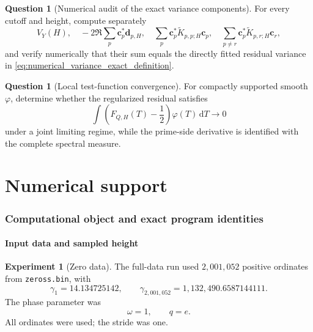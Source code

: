 \documentclass[11pt]{amsart}
\numberwithin{equation}{section}
\theoremstyle{plain}
\theoremstyle{definition}
\newtheorem{experiment}[theorem]{Experiment}
\newtheorem{question}[theorem]{Question}
\theoremstyle{remark}
\newcommand{\1}{\mathbf{1}}
\newcommand{\dd}{\,\mathrm{d}}
\begin{document}
\begin{question}[Numerical audit of the exact variance components]
\label{question:projected_tower_blocks}
For every cutoff and height, compute separately
\begin{equation}
V_Y(H),
\quad
-2\Re\sum_p\mathbf c_p^\ast\mathbf d_{p,H},
\quad
\sum_p\mathbf c_p^\ast\widetilde K_{p,p;H}\mathbf c_p,
\quad
\sum_{p\neq r}\mathbf c_p^\ast\widetilde K_{p,r;H}\mathbf c_r,
\label{eq:numerical_variance_components}
\end{equation}
and verify numerically that their sum equals the directly fitted residual
variance in \eqref{eq:numerical_variance_exact_definition}.
\end{question}

\begin{question}[Local test-function convergence]
\label{question:local_test_functions}
For compactly supported smooth \(\varphi\), determine whether the
regularized residual satisfies
\begin{equation}
\int
\left(F_{Q,H}(T)-\frac12\right)\varphi(T)\dd T
\longrightarrow0
\label{eq:test_function_target}
\end{equation}
under a joint limiting regime, while the prime-side derivative is
identified with the complete spectral measure.
\end{question}


\part{Numerical support}

\section{Computational object and exact program identities}
\label{sec:numerical_program}

\subsection{Input data and sampled height}
\label{subsec:numerical_input_data}

\begin{experiment}[Zero data]
\label{exp:numerical_zero_data}
The full-data run used $2{,}001{,}052$ positive ordinates from
\texttt{zeross.bin}, with
\begin{equation}
\gamma_1=14.134725142,
\qquad
\gamma_{2{,}001{,}052}=1{,}132{,}490.6587144111.
\label{eq:numerical_zero_endpoints_detailed}
\end{equation}
The phase parameter was
\begin{equation}
\omega=1,
\qquad q=e.
\label{eq:numerical_omega}
\end{equation}
All ordinates were used; the stride was one.
\end{experiment}
\end{document}
